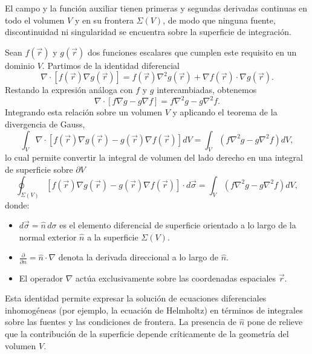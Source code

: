		\begin{Assumption}
			El campo y la función auxiliar tienen primeras y segundas derivadas continuas en todo el volumen $V$ y en su frontera $\Sigma(V)$, de modo que ninguna fuente, discontinuidad ni singularidad se encuentra sobre la superficie de integración.
		\end{Assumption}

		Sean $f(\vec{r})$ y $g(\vec{r})$ dos funciones escalares que cumplen este requisito en un dominio $V$. Partimos de la identidad diferencial
		\begin{equation}
			\nabla \cdot \left[ f(\vec{r})\nabla g(\vec{r}) \right] = f(\vec{r})\nabla^{2}g(\vec{r}) + \nabla f(\vec{r}) \cdot \nabla g(\vec{r}).
		\end{equation}
		Restando la expresión análoga con $f$ y $g$ intercambiadas, obtenemos
		\begin{equation}
			\nabla \cdot \left[ f\nabla g - g\nabla f \right] = f\nabla^{2}g - g\nabla^{2}f.
		\end{equation}
		Integrando esta relación sobre un volumen $V$ y aplicando el teorema de la divergencia de Gauss,
		\begin{equation}
			\int_{V} \nabla \cdot \left[ f(\vec{r})\nabla g(\vec{r}) - g(\vec{r})\nabla f(\vec{r}) \right] dV = \int_{V} \left( f\nabla^{2}g - g\nabla^{2}f \right) dV,
		\end{equation}
		lo cual permite convertir la integral de volumen del lado derecho en una integral de superficie sobre $\partial V$
		\begin{equation}
			\oint_{\Sigma(V)} \left[ f(\vec{r})\nabla g(\vec{r}) - g(\vec{r})\nabla f(\vec{r}) \right] \cdot d\vec{\sigma} = \int_V \left( f\nabla^2 g - g\nabla^2 f \right) dV,
		\end{equation}
		donde:
		\begin{itemize}
			\item $ d\vec{\sigma} = \hat{n}\, d\sigma $ es el elemento diferencial de superficie orientado a lo largo de la normal exterior $\hat{n}$ a la superficie $\Sigma(V)$.
			\item $\frac{\partial}{\partial n} = \hat{n} \cdot \nabla$ denota la derivada direccional a lo largo de $\hat{n}$.
			\item El operador $\nabla$ actúa exclusivamente sobre las coordenadas espaciales $\vec{r}$.
		\end{itemize}

		Esta identidad permite expresar la solución de ecuaciones diferenciales inhomogéneas (por ejemplo, la ecuación de Helmholtz) en términos de integrales sobre las fuentes y las condiciones de frontera. La presencia de $\hat{n}$ pone de relieve que la contribución de la superficie depende críticamente de la geometría del volumen $V$.

